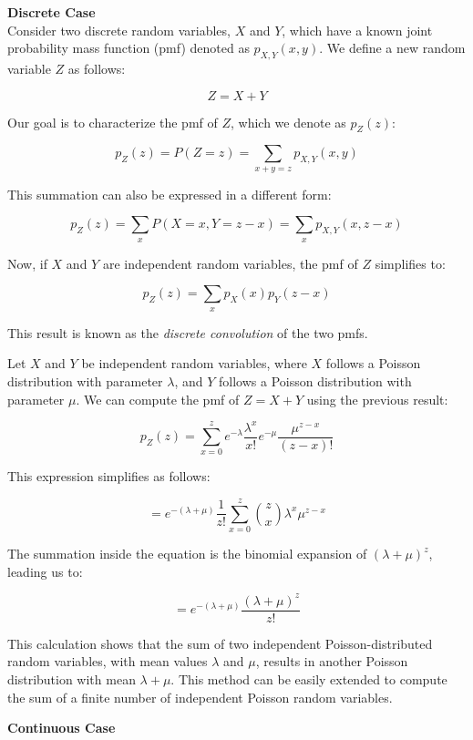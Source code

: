 \textbf{Discrete Case}\\

Consider two discrete random variables, \(X\) and \(Y\), which have a known joint probability mass function (pmf) denoted as \(p_{X,Y}(x,y)\). We define a new random variable \(Z\) as follows:

\[
Z = X + Y
\]

Our goal is to characterize the pmf of \(Z\), which we denote as \(p_Z(z)\):

\[
p_Z(z) = P(Z = z) = \sum_{x+y=z} p_{X,Y}(x,y)
\]

This summation can also be expressed in a different form:

\[
p_Z(z) = \sum_{x} P(X = x, Y = z - x) = \sum_{x} p_{X,Y}(x, z - x)
\]

Now, if \(X\) and \(Y\) are independent random variables, the pmf of \(Z\) simplifies to:

\[
p_Z(z) = \sum_{x} p_X(x) p_Y(z - x)
\]

This result is known as the \textit{discrete convolution} of the two pmfs.

\begin{example}
Let \(X\) and \(Y\) be independent random variables, where \(X\) follows a Poisson distribution with parameter \(\lambda\), and \(Y\) follows a Poisson distribution with parameter \(\mu\). We can compute the pmf of \(Z = X + Y\) using the previous result:

\[
p_Z(z) = \sum_{x=0}^{z} e^{-\lambda} \frac{\lambda^x}{x!} e^{-\mu} \frac{\mu^{z-x}}{(z-x)!}
\]

This expression simplifies as follows:

\[
= e^{-(\lambda+\mu)} \frac{1}{z!} \sum_{x=0}^{z} \binom{z}{x} \lambda^x \mu^{z-x}
\]

The summation inside the equation is the binomial expansion of \((\lambda + \mu)^z\), leading us to:

\[
= e^{-(\lambda+\mu)} \frac{(\lambda + \mu)^z}{z!}
\]

This calculation shows that the sum of two independent Poisson-distributed random variables, with mean values \(\lambda\) and \(\mu\), results in another Poisson distribution with mean \(\lambda + \mu\). This method can be easily extended to compute the sum of a finite number of independent Poisson random variables.
\end{example}

\textbf{Continuous Case}\\

